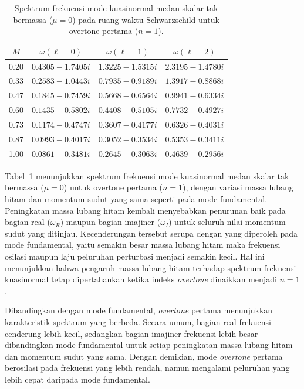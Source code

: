 \begin{table}[H]
\centering
\caption{Spektrum frekuensi mode kuasinormal medan skalar tak bermassa ($\mu=0$) pada ruang-waktu Schwarzschild untuk overtone pertama ($n=1$).}
\vspace{0.2cm}
\renewcommand{\arraystretch}{1.25}
\begin{tabular}{cccc}
\toprule
$M$ & $\omega(\ell=0)$ & $\omega(\ell=1)$ & $\omega(\ell=2)$ \\
\midrule
0.20 & $0.4305 - 1.7405i$ & $1.3225 - 1.5315i$ & $2.3195 - 1.4780i$ \\
0.33   & $0.2583 - 1.0443i$ & $0.7935 - 0.9189i$ & $1.3917 - 0.8868i$ \\
0.47   & $0.1845 - 0.7459i$ & $0.5668 - 0.6564i$ & $0.9941 - 0.6334i$ \\
0.60   & $0.1435 - 0.5802i$ & $0.4408 - 0.5105i$ & $0.7732 - 0.4927i$ \\
0.73   & $0.1174 - 0.4747i$ & $0.3607 - 0.4177i$ & $0.6326 - 0.4031i$ \\
0.87   & $0.0993 - 0.4017i$ & $0.3052 - 0.3534i$ & $0.5353 - 0.3411i$ \\
1.00    & $0.0861 - 0.3481i$ & $0.2645 - 0.3063i$ & $0.4639 - 0.2956i$ \\
\bottomrule
\end{tabular}
\label{tab:sch_mu0_n1}
\end{table}

Tabel~\ref{tab:sch_mu0_n1} menunjukkan spektrum frekuensi mode kuasinormal medan skalar tak bermassa ($\mu=0$) untuk overtone pertama ($n=1$), dengan variasi massa lubang hitam dan momentum sudut yang sama seperti pada mode fundamental. Peningkatan massa lubang hitam kembali menyebabkan penurunan baik pada bagian real ($\omega_R$) maupun bagian imajiner ($\omega_I$) untuk seluruh nilai momentum sudut yang ditinjau. Kecenderungan tersebut serupa dengan yang diperoleh pada mode fundamental, yaitu semakin besar massa lubang hitam maka frekuensi osilasi maupun laju peluruhan perturbasi menjadi semakin kecil. Hal ini menunjukkan bahwa pengaruh massa lubang hitam terhadap spektrum frekuensi kuasinormal tetap dipertahankan ketika indeks \textit{overtone} dinaikkan menjadi $n=1$.

Dibandingkan dengan mode fundamental, \textit{overtone} pertama menunjukkan karakteristik spektrum yang berbeda. Secara umum, bagian real frekuensi cenderung lebih kecil, sedangkan bagian imajiner frekuensi lebih besar dibandingkan mode fundamental untuk setiap peningkatan massa lubang hitam dan momentum sudut yang sama. Dengan demikian, mode \textit{overtone} pertama berosilasi pada frekuensi yang lebih rendah, namun mengalami peluruhan yang lebih cepat daripada mode fundamental.

